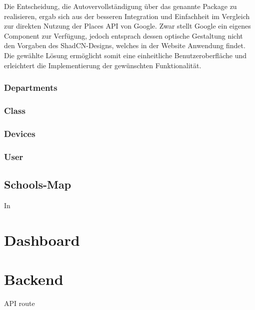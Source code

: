 \begin{inhalt}
Die Entscheidung, die Autovervollständigung über das genannte Package zu realisieren, ergab sich aus der besseren Integration und Einfachheit im Vergleich zur direkten Nutzung der Places API von Google. Zwar stellt Google ein eigenes Component zur Verfügung, jedoch entsprach dessen optische Gestaltung nicht den Vorgaben des ShadCN-Designs, welches in der Website Anwendung findet. Die gewählte Lösung ermöglicht somit eine einheitliche Benutzeroberfläche und erleichtert die Implementierung der gewünschten Funktionalität.


\subsubsection{Departments}

\subsubsection{Class}

\subsubsection{Devices}

\subsubsection{User}

\subsection{Schools-Map}


In


\section{Dashboard}

\section{Backend}



API route






\end{inhalt}